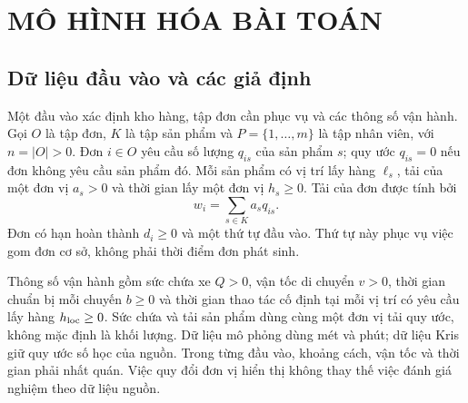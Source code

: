 \section{MÔ HÌNH HÓA BÀI TOÁN}
\label{sec:chuong2}

\subsection{Dữ liệu đầu vào và các giả định}

Một đầu vào xác định kho hàng, tập đơn cần phục vụ và các thông số vận hành. Gọi $O$ là tập đơn, $K$ là tập sản phẩm và $P=\{1,\ldots,m\}$ là tập nhân viên, với $n=|O|>0$. Đơn $i\in O$ yêu cầu số lượng $q_{is}$ của sản phẩm $s$; quy ước $q_{is}=0$ nếu đơn không yêu cầu sản phẩm đó. Mỗi sản phẩm có vị trí lấy hàng $\ell_s$, tải của một đơn vị $a_s>0$ và thời gian lấy một đơn vị $h_s\geq0$. Tải của đơn được tính bởi
\begin{equation}
 w_i=\sum_{s\in K}a_sq_{is}.\label{eq:model-order-load}
\end{equation}
Đơn có hạn hoàn thành $d_i\geq0$ và một thứ tự đầu vào. Thứ tự này phục vụ việc gom đơn cơ sở, không phải thời điểm đơn phát sinh.

Thông số vận hành gồm sức chứa xe $Q>0$, vận tốc di chuyển $v>0$, thời gian chuẩn bị mỗi chuyến $b\geq0$ và thời gian thao tác cố định tại mỗi vị trí có yêu cầu lấy hàng $h_{\rm loc}\geq0$. Sức chứa và tải sản phẩm dùng cùng một đơn vị tải quy ước, không mặc định là khối lượng. Dữ liệu mô phỏng dùng mét và phút; dữ liệu Kris giữ quy ước số học của nguồn. Trong từng đầu vào, khoảng cách, vận tốc và thời gian phải nhất quán. Việc quy đổi đơn vị hiển thị không thay thế việc đánh giá nghiệm theo dữ liệu nguồn.

